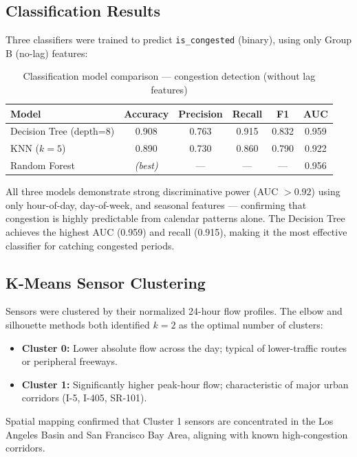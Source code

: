 \documentclass[12pt,a4paper]{article}
\begin{document}
\subsection{Classification Results}

Three classifiers were trained to predict \texttt{is\_congested} (binary), using only Group B (no-lag) features:

\begin{table}[H]
\centering
\caption{Classification model comparison — congestion detection (without lag features)}
\begin{tabular}{lccccc}
\toprule
\textbf{Model} & \textbf{Accuracy} & \textbf{Precision} & \textbf{Recall} & \textbf{F1} & \textbf{AUC} \\
\midrule
Decision Tree (depth=8) & 0.908 & 0.763 & 0.915 & 0.832 & 0.959 \\
KNN ($k=5$)             & 0.890 & 0.730 & 0.860 & 0.790 & 0.922 \\
Random Forest           & \textit{(best)} & — & — & — & 0.956 \\
\bottomrule
\end{tabular}
\end{table}

All three models demonstrate strong discriminative power (AUC $> 0.92$) using only hour-of-day, day-of-week, and seasonal features — confirming that congestion is highly predictable from calendar patterns alone. The Decision Tree achieves the highest AUC (0.959) and recall (0.915), making it the most effective classifier for catching congested periods.

\subsection{K-Means Sensor Clustering}

Sensors were clustered by their normalized 24-hour flow profiles. The elbow and silhouette methods both identified $k=2$ as the optimal number of clusters:

\begin{itemize}
    \item \textbf{Cluster 0:} Lower absolute flow across the day; typical of lower-traffic routes or peripheral freeways.
    \item \textbf{Cluster 1:} Significantly higher peak-hour flow; characteristic of major urban corridors (I-5, I-405, SR-101).
\end{itemize}

Spatial mapping confirmed that Cluster 1 sensors are concentrated in the Los Angeles Basin and San Francisco Bay Area, aligning with known high-congestion corridors.
\end{document}
